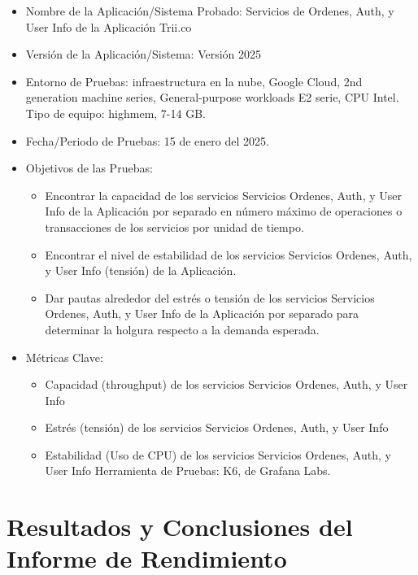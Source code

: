 \documentclass[
  paper=a4,
  ,captions=tableheading
]{scrartcl}
\providecommand{\tightlist}{%
  \setlength{\itemsep}{0pt}\setlength{\parskip}{0pt}}
\begin{document}
\begin{itemize}
\tightlist
\item
  Nombre de la Aplicación/Sistema Probado: Servicios de Ordenes, Auth, y
  User Info de la Aplicación Trii.co
\item
  Versión de la Aplicación/Sistema: Versión 2025
\item
  Entorno de Pruebas: infraestructura en la nube, Google Cloud, 2nd
  generation machine series, General-purpose workloads E2 serie, CPU
  Intel. Tipo de equipo: highmem, 7-14 GB.
\item
  Fecha/Periodo de Pruebas: 15 de enero del 2025.
\item
  Objetivos de las Pruebas:

  \begin{itemize}
  \tightlist
  \item
    Encontrar la capacidad de los servicios Servicios Ordenes, Auth, y
    User Info de la Aplicación por separado en número máximo de
    operaciones o transacciones de los servicios por unidad de tiempo.
  \item
    Encontrar el nivel de estabilidad de los servicios Servicios
    Ordenes, Auth, y User Info (tensión) de la Aplicación.
  \item
    Dar pautas alrededor del estrés o tensión de los servicios Servicios
    Ordenes, Auth, y User Info de la Aplicación por separado para
    determinar la holgura respecto a la demanda esperada.
  \end{itemize}
\item
  Métricas Clave:

  \begin{itemize}
  \tightlist
  \item
    Capacidad (throughput) de los servicios Servicios Ordenes, Auth, y
    User Info
  \item
    Estrés (tensión) de los servicios Servicios Ordenes, Auth, y User
    Info
  \item
    Estabilidad (Uso de CPU) de los servicios Servicios Ordenes, Auth, y
    User Info Herramienta de Pruebas: K6, de Grafana Labs.
  \end{itemize}
\end{itemize}

\newpage

\section{Resultados y Conclusiones del Informe de
Rendimiento}\label{sec:resultados-y-conclusiones-del-informe-de-rendimiento}
\end{document}
